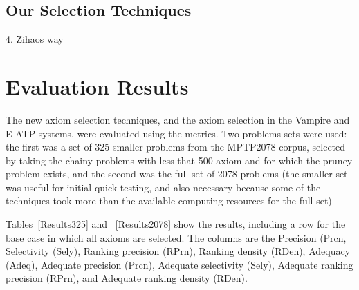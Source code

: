 \documentclass[EPiC]{easychair}
\begin{document}
\subsection{Our Selection Techniques}
\label{Zihao}

4. Zihaos way
\section{Evaluation Results}
\label{Results}

The new axiom selection techniques, and the axiom selection in the Vampire 
and E ATP systems, were evaluated using the metrics.
Two problems sets were used: the first was a set of 325 smaller problems
from the MPTP2078 corpus, selected by taking the chainy problems with less
that 500 axiom and for which the pruney problem exists, and the second was
the full set of 2078 problems (the smaller set was useful for initial
quick testing, and also necessary because some of the techniques took
more than the available computing resources for the full set)

Tables~\ref{Results325} and ~\ref{Results2078} show the results, including
a row for the base case in which all axioms are selected.
The columns are the 
Precision (Prcn, 
Selectivity (Sely), 
Ranking precision (RPrn), 
Ranking density (RDen), 
Adequacy (Adeq),
Adequate precision (Prcn), Adequate selectivity (Sely), Adequate
ranking precision (RPrn), and Adequate ranking density (RDen).
\end{document}
